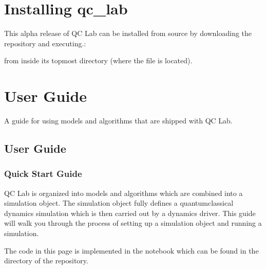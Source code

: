 \documentclass[letterpaper,10pt,english]{sphinxmanual}
\begin{document}
\chapter{Installing qc\_lab}
\label{\detokenize{index:installing-qc-lab}}
\sphinxAtStartPar
This alpha release of QC Lab can be installed from source by downloading the repository and executing.:

\begin{sphinxVerbatim}[commandchars=\\\{\}]
   
\end{sphinxVerbatim}

\sphinxAtStartPar
from inside its topmost directory (where the  file is located).


\chapter{User Guide}
\label{\detokenize{index:user-guide}}
\sphinxAtStartPar
A guide for using models and algorithms that are shipped with QC Lab.

\sphinxstepscope


\section{User Guide}
\label{\detokenize{user_guide/index:user-guide}}\label{\detokenize{user_guide/index:index}}\label{\detokenize{user_guide/index::doc}}
\sphinxstepscope


\subsection{Quick Start Guide}
\label{\detokenize{user_guide/quickstart/quickstart:quick-start-guide}}\label{\detokenize{user_guide/quickstart/quickstart:quickstart}}\label{\detokenize{user_guide/quickstart/quickstart::doc}}
\sphinxAtStartPar
QC Lab is organized into models and algorithms which are combined into a simulation object.
The simulation object fully defines a quantum\sphinxhyphen{}classical dynamics simulation which is then carried out by a dynamics driver.
This guide will walk you through the process of setting up a simulation object and running a simulation.

\sphinxAtStartPar
The code in this page is implemented in the notebook  which can be found in the  directory of the repository.
\end{document}
